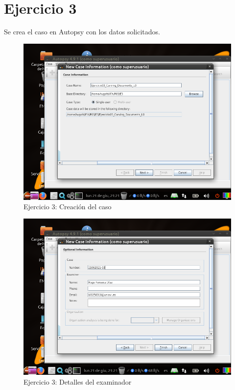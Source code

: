 \documentclass[11pt]{article}
\begin{document}
\section{Ejercicio 3}
Se crea el caso en Autopsy con los datos solicitados.

\begin{figure}[H]
  \caption{Ejercicio 3: Creación del caso}
  \centering
  \includegraphics[scale=0.7]{e3-1.png}
\end{figure}

\begin{figure}[H]
  \caption{Ejercicio 3: Detalles del examinador}
  \centering
  \includegraphics[scale=0.7]{e3-2.png}
\end{figure}
\end{document}
